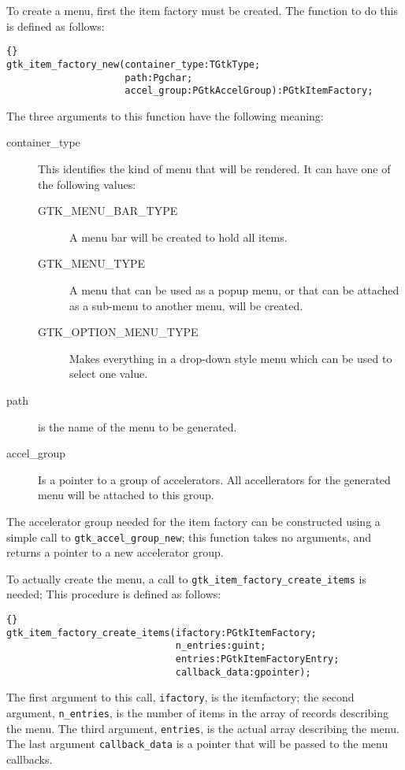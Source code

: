 \documentclass[10pt]{article}
\begin{document}
To create a menu, first the item factory must be created. The function to do 
this is defined as follows:
\begin{lstlisting}{}
gtk_item_factory_new(container_type:TGtkType; 
                     path:Pgchar;
                     accel_group:PGtkAccelGroup):PGtkItemFactory;
\end{lstlisting}
The three arguments to this function have the following meaning:
\begin{description}
\item[container\_type] This identifies the kind of menu that will be
rendered. It can have one of the following values:
\begin{description}
\item[GTK\_MENU\_BAR\_TYPE] A menu bar will be created to hold all items.
\item[GTK\_MENU\_TYPE] A menu that can be used as a popup menu, or that can be
attached as a sub-menu to another menu, will be created.
\item[GTK\_OPTION\_MENU\_TYPE] Makes everything in a drop-down style menu which
can be used to select one value.
\end{description}
\item[path] is the name of the menu to be generated.
\item[accel\_group] Is a pointer to a group of accelerators. All
accellerators for the generated menu will be attached to this group.
\end{description}

The accelerator group needed for the item factory can be constructed 
using a simple call to \lstinline|gtk_accel_group_new|; this function 
takes no arguments, and returns a pointer to a new accelerator group.

To actually create the menu, a call to
\lstinline|gtk_item_factory_create_items| is needed; This procedure is 
defined as follows:
\begin{lstlisting}{}
gtk_item_factory_create_items(ifactory:PGtkItemFactory; 
                              n_entries:guint; 
                              entries:PGtkItemFactoryEntry; 
                              callback_data:gpointer);
\end{lstlisting}
The first argument to this call, \lstinline|ifactory|, is the itemfactory; 
the second argument, \lstinline|n_entries|, is the number of items in the 
array of records describing the menu. The third argument, \lstinline|entries|,
is the actual array describing the menu. The last argument
\lstinline|callback_data| is a pointer that will be passed to the menu
callbacks.
\end{document}
